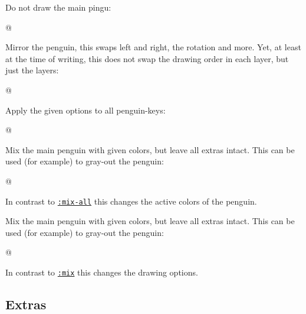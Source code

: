 \documentclass[parskip=half,english,numbers=noenddot,footnotes=nomultiple,oneside]{scrartcl}
\def\lpingu#1{\lstinline[style=lstpingu,language=pingulang]'#1'}
\def\cursub{}
\newcommand*\dkeyref[2][/pingu/]{\hyperref[pk:#1#2]{\lpingu{#2}}}
\begin{document}
	Do not draw the main pingu:
\begin{tcblisting}{@}
\end{tcblisting}
\endkeyexplain

	Mirror the penguin, this swaps left and right, the rotation and more.
	Yet, at least at the time of writing, this does not swap the drawing order in each layer, but just the layers:
\begin{tcblisting}{@}
\begin{tikzpicture}
	\pingu[:back, left wing wave,
	       cane left, left item angle=70]
\end{tikzpicture}
\end{tcblisting}
\endkeyexplain

	Apply the given options to all penguin-keys:
\begin{tcblisting}{@}
\begin{tikzpicture}
	\pingu[:pingu={/pingu/@block/.style={fill=green}}]
\end{tikzpicture}
\end{tcblisting}
\endkeyexplain

	Mix the main penguin with given colors, but leave all extras intact. This can be used (for example) to gray-out the penguin:
\begin{tcblisting}{@}
\begin{tikzpicture}
	\pingu[mask,tie=red,lollipop left,:mix=50!green]
\end{tikzpicture}
\end{tcblisting}
	In contrast to \dkeyref{:mix-all} this changes the active colors of the penguin.
\endkeyexplain

	Mix the main penguin with given colors, but leave all extras intact. This can be used (for example) to gray-out the penguin:
\begin{tcblisting}{@}
\begin{tikzpicture}
	\pingu[mask,tie=red,:mix-all=50!green]
\end{tikzpicture}
\end{tcblisting}
	In contrast to \dkeyref{:mix} this changes the drawing options.
\endkeyexplain


\def\cursub{}
\subsection{Extras}
\end{document}
